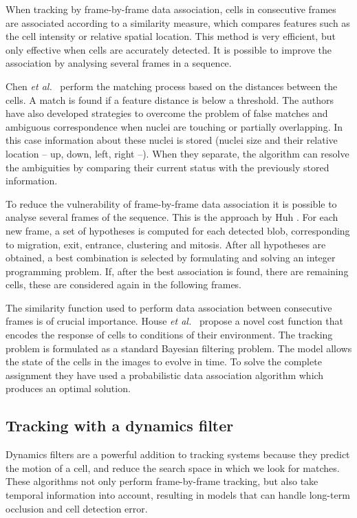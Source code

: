 When tracking by frame-by-frame data association, cells in consecutive frames are associated according to a similarity measure, which compares features such as the cell intensity or relative spatial location. This method is very efficient, but only effective when cells are accurately detected. It is possible to improve the association by analysing several frames in a sequence.

Chen \emph{et al.}~\cite{chen06} perform the matching process based on the distances between the cells. A match is found if a feature distance is below a threshold. The authors have also developed strategies to overcome the problem of false matches and ambiguous correspondence when nuclei are touching or partially overlapping. In this case information about these nuclei is stored (nuclei size and their relative location -- up, down, left, right --). When they separate, the algorithm can resolve the ambiguities by comparing their current status with the previously stored information.

To reduce the vulnerability of frame-by-frame data association it is possible to analyse several frames of the sequence. This is the approach by Huh \cite{huh13}. For each new frame, a set of hypotheses is computed for each detected blob, corresponding to migration, exit, entrance, clustering and mitosis. After all hypotheses are obtained, a best combination is selected by formulating and solving an integer programming problem. If, after the best association is found, there are remaining cells, these are considered again in the following frames.

The similarity function used to perform data association between consecutive frames is of crucial importance. House \emph{et al.}~\cite{house09} propose a novel cost function that encodes the response of cells to conditions of their environment. The tracking problem is formulated as a standard Bayesian filtering problem. The model allows the state of the cells in the images to evolve in time. To solve the complete assignment they have used a probabilistic data association algorithm which produces an optimal solution.

\subsection{Tracking with a dynamics filter}
Dynamics filters are a powerful addition to tracking systems because they predict the motion of a cell, and reduce the search space in which we look for matches. These algorithms not only perform frame-by-frame tracking, but also take temporal information into account, resulting in models that can handle long-term occlusion and cell detection error.

